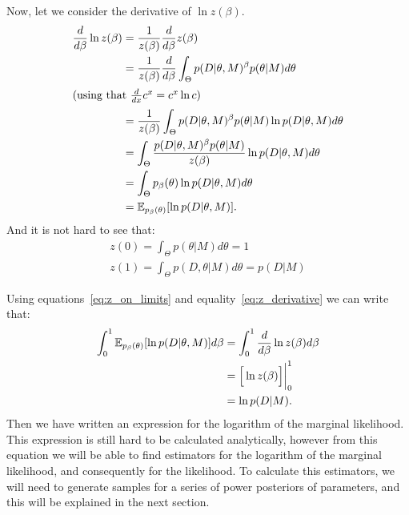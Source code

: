 Now, let we consider the derivative of $\ln z(\beta)$.
\begin{align}
    \frac{d}{d\beta} \ln z(\beta) &= \frac{1}{z(\beta)}  
        \frac{d}{d\beta} z(\beta) \notag\\
    &= \frac{1}{z(\beta)} \frac{d}{d\beta} 
        \int_\Theta p (D | \theta, M)^\beta p(\theta | M) d\theta \notag\\
    \shortintertext{(using that $\frac{d}{dx} c^x = c^x \ln c$)}
    &= \frac{1}{z(\beta)} \int_\Theta p (D | \theta, M)^\beta 
        p(\theta | M) \ln p(D|\theta, M)d\theta \notag\\
    &= \int_\Theta \frac{p (D | \theta, M)^\beta p(\theta | M)}
                        {z(\beta)}
                    \ln p(D| \theta, M)d\theta \notag\\
    &=\int_\Theta p_\beta (\theta) \ln p (D | \theta, M)d\theta \notag\\ 
    &=\mathbb{E}_{p_\beta (\theta)} [\ln p(D|\theta, M)]. \label{eq:z_derivative}
\end{align}
And it is not hard to see that:
\begin{equation}
\begin{gathered}
    z (0) = \int_\Theta p (\theta | M)d\theta = 1 \\
    z (1) = \int_\Theta p (D, \theta | M)d\theta = p (D|M) 
    \label{eq:z_on_limits}
\end{gathered}
\end{equation}

Using equations~\ref{eq:z_on_limits} and equality~\ref{eq:z_derivative}
we can write that:
\begin{align}
    \int_0^1 \mathbb{E}_{p_\beta (\theta)} [\ln p(D|\theta, M)]d\beta 
    &= \int_0^1 \frac{d}{d\beta} \ln z(\beta) d\beta \notag \\
    &= \Big[\ln z(\beta)\Big]\bigg\rvert^1_0 \notag \\
    &= \ln p (D | M).
    \label{eq:thermodynamic_integral}
\end{align}
Then we have written an expression for the logarithm of the marginal
likelihood. This expression is still hard to be calculated analytically,
however from this equation we will be able to find estimators for
the logarithm of the marginal likelihood, and consequently for the
likelihood. To calculate this estimators, we will need to generate 
samples for a series of power posteriors of parameters, and this will
be explained in the next section.

